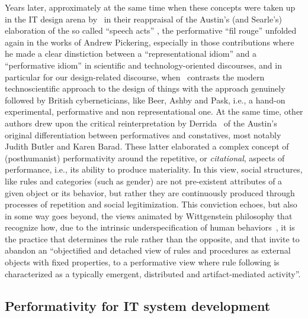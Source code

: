 \documentclass{article}
\begin{document}
Years later, approximately at the same time when these concepts were taken up in the IT design arena by~\citet{winograd_understanding_1986} in their reappraisal of the Austin's (and Searle's) elaboration of the so called ``speech acts'' , the performative ``fil rouge'' unfolded again in the works of Andrew Pickering, especially in those contributions where he made a clear dinstiction between a ``representational idiom'' and a ``performative idiom'' in scientific and technology-oriented discourses\citep{pickering_mangle_1995}, and in particular for our design-related discourse, when~\citet{pickering_beyond_2008} contrasts the modern technoscientific approach to the design of things with the approach genuinely followed by British cyberneticians, like Beer, Ashby and Pask, i.e., a hand-on experimental, performative and non representational one. At the same time, other authors drew upon the critical reinterpretation by Derrida~\citep{simon_knowing_2010} of the Austin's original differentiation between performatives and constatives, most notably Judith Butler and Karen Barad. These latter elaborated a complex concept of (posthumanist) performativity around the repetitive, or \emph{citational}, aspects of performance, i.e., its ability to produce materiality. In this view, social structures, like rules and categories (such as gender) are not pre-existent attributes of a given object or its behavior, but rather they are continuously produced through processes of repetition and social legitimization. This conviction echoes, but also in some way goes beyond, the views animated by Wittgenstein philosophy that recognize how, due to the intrinsic underspecification of human behaviors~\citep{schmidt_dispelling_2011}, it is the practice that determines the rule rather than the opposite, and that invite to abandon an ``objectified and detached view of rules and procedures as external objects with fixed properties, to a performative view where rule following is characterized as a typically emergent, distributed and artifact-mediated activity''\citep{dadderio_performativity_2008}. 







\subsection{Performativity for IT system development}
\end{document}
